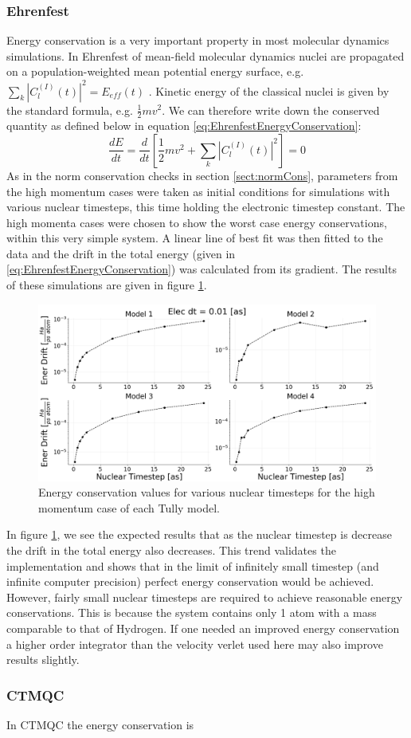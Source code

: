 \subsubsection{Ehrenfest}
Energy conservation is a very important property in most molecular dynamics simulations. In Ehrenfest of mean-field molecular dynamics nuclei are propagated on a population-weighted mean potential energy surface, e.g. $\sum_{k}|C_{l}^{(I)}(t)|^2 = E_{eff}(t)$ \cite{EhrenEnerCons}. Kinetic energy of the classical nuclei is given by the standard formula, e.g. $\frac{1}{2} m v^2$. We can therefore write down the conserved quantity as defined below in equation \eqref{eq:EhrenfestEnergyConservation}:
\begin{equation}
  \frac{d E}{dt} = \frac{d}{dt} \left[ \frac{1}{2} m v^2 + \sum_{k}|C_{l}^{(I)}(t)|^2 \right] = 0
  \label{eq:EhrenfestEnergyConservation}
\end{equation}
As in the norm conservation checks in section \ref{sect:normCons},  parameters from the high momentum cases were taken as initial conditions for simulations with various nuclear timesteps, this time holding the electronic timestep constant. The high momenta cases were chosen to show the worst case energy conservations, within this very simple system. A linear line of best fit was then fitted to the data and the drift in the total energy (given in \eqref{eq:EhrenfestEnergyConservation}) was calculated from its gradient. The results of these simulations are given in figure \ref{fig:EhrenEnerCons}.
\begin{figure}[h]
  \includegraphics[width=\textwidth]{./img/CTMQC/TullyModels/Ehren_EnerCons.png}
  \caption{\label{fig:EhrenEnerCons}Energy conservation values for various nuclear timesteps for the high momentum case of each Tully model.}
\end{figure}
In figure \ref{fig:EhrenEnerCons}, we see the expected results that as the nuclear timestep is decrease the drift in the total energy also decreases. This trend validates the implementation and shows that in the limit of infinitely small timestep (and infinite computer precision) perfect energy conservation would be achieved. However, fairly small nuclear timesteps are required to achieve reasonable energy conservations. This is because the system contains only 1 atom with a mass comparable to that of Hydrogen. If one needed an improved energy conservation a higher order integrator than the velocity verlet used here may also improve results slightly.
\subsubsection{CTMQC}
In CTMQC the energy conservation is 




